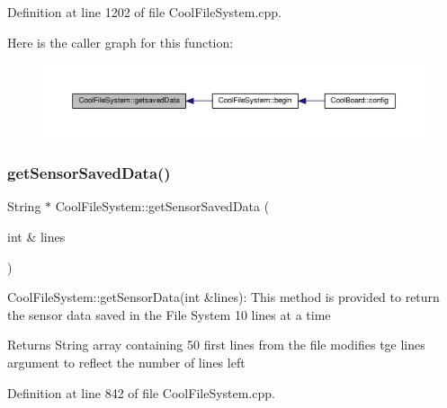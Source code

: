 Definition at line 1202 of file Cool\+File\+System.\+cpp.

Here is the caller graph for this function\+:\nopagebreak
\begin{figure}[H]
\begin{center}
\leavevmode
\includegraphics[width=350pt]{class_cool_file_system_a70701d05e811604af1b531f4f6dc69ed_icgraph}
\end{center}
\end{figure}
\mbox{\label{class_cool_file_system_a3223ffff4266a6300988fab956d6b4b2}} 
\subsubsection{\texorpdfstring{get\+Sensor\+Saved\+Data()}{getSensorSavedData()}}
{\footnotesize\ttfamily String $\ast$ Cool\+File\+System\+::get\+Sensor\+Saved\+Data (\begin{DoxyParamCaption}\item[{int \&}]{lines }\end{DoxyParamCaption})}

Cool\+File\+System\+::get\+Sensor\+Data(int \&lines)\+: This method is provided to return the sensor data saved in the File System 10 lines at a time

\begin{DoxyReturn}{Returns}
String array containing 50 first lines from the file modifies tge lines argument to reflect the number of lines left 
\end{DoxyReturn}


Definition at line 842 of file Cool\+File\+System.\+cpp.

